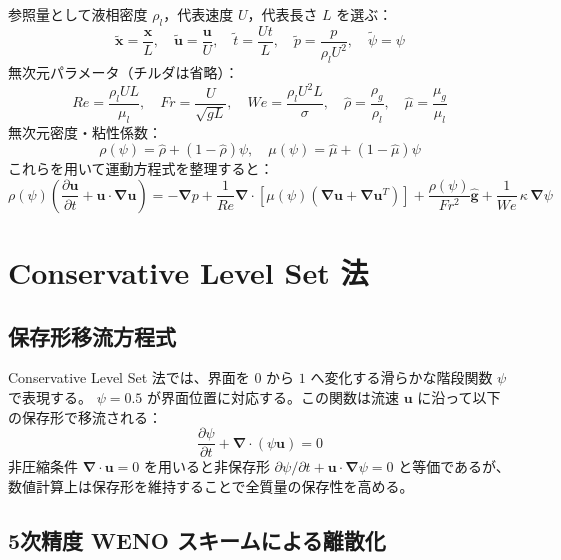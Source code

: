 \documentclass[12pt, a4paper, titlepage, xelatex, ja=standard]{bxjsarticle}
\newcommand{\pd}[2]{\dfrac{\partial #1}{\partial #2}}
\newcommand{\bu}{\bm{u}}
\newcommand{\bg}{\bm{g}}
\newcommand{\bnabla}{\bm{\nabla}}
\begin{document}
参照量として液相密度 $\rho_l$，代表速度 $U$，代表長さ $L$ を選ぶ：
\begin{equation}
  \tilde{\bm{x}} = \frac{\bm{x}}{L},\quad \tilde{\bu} = \frac{\bu}{U},\quad \tilde{t} = \frac{Ut}{L},\quad \tilde{p} = \frac{p}{\rho_l U^2},\quad \tilde{\psi} = \psi \label{eq:nondim_vars}
\end{equation}
無次元パラメータ（チルダは省略）：
\begin{equation}
  Re = \frac{\rho_l U L}{\mu_l},\quad Fr = \frac{U}{\sqrt{gL}},\quad We = \frac{\rho_l U^2 L}{\sigma},\quad \hat{\rho} = \frac{\rho_g}{\rho_l},\quad \hat{\mu} = \frac{\mu_g}{\mu_l} \label{eq:nondim_params}
\end{equation}
無次元密度・粘性係数：
\begin{equation}
  \rho(\psi) = \hat{\rho} + (1-\hat{\rho})\psi,\quad \mu(\psi) = \hat{\mu} + (1-\hat{\mu})\psi
\end{equation}
これらを用いて運動方程式を整理すると：
\begin{equation}
  \rho(\psi)\!\left(\pd{\bu}{t} + \bu\cdot\bnabla\bu\right)
  = -\bnabla p
  + \frac{1}{Re}\bnabla\cdot\!\left[\mu(\psi)\!\left(\bnabla\bu + \bnabla\bu^T\right)\right]
  + \frac{\rho(\psi)}{Fr^2}\hat{\bg}
  + \frac{1}{We}\,\kappa\,\bnabla\psi
\end{equation}


\section{Conservative Level Set 法}
\label{sec:levelset}

\subsection{保存形移流方程式}

Conservative Level Set 法では、界面を $0$ から $1$ へ変化する滑らかな階段関数 $\psi$ で表現する。
$\psi=0.5$ が界面位置に対応する。この関数は流速 $\bu$ に沿って以下の保存形で移流される：
\begin{equation}
  \pd{\psi}{t} + \bnabla \cdot (\psi \bu) = 0
\end{equation}
非圧縮条件 $\bnabla \cdot \bu = 0$ を用いると非保存形 $\partial \psi / \partial t + \bu \cdot \bnabla \psi = 0$ と等価であるが、
数値計算上は保存形を維持することで全質量の保存性を高める。

\subsection{5次精度 WENO スキームによる離散化}
\end{document}
